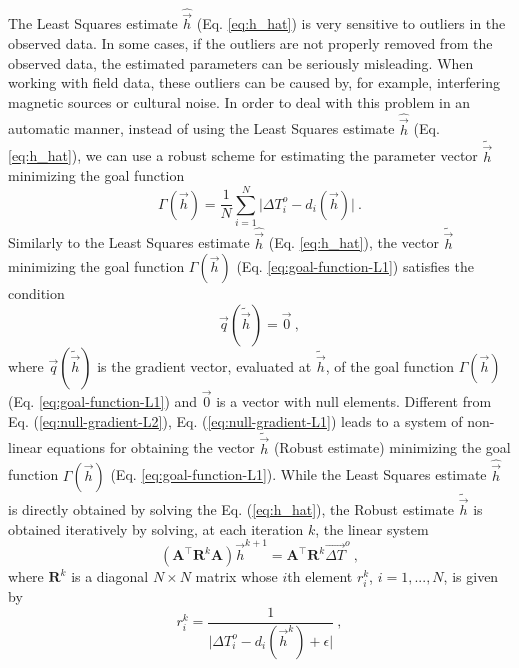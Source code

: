 \documentclass[journal abbreviation, npg]{copernicus}
\begin{document}
The Least Squares estimate $\hat{\vec{h}}$ (Eq. \ref{eq:h_hat}) is very sensitive to outliers in the observed data. In some cases, if the outliers are not properly removed from the observed data, the estimated parameters can be seriously misleading. When working with field data, these outliers can be caused by, for example, interfering magnetic sources or cultural noise. In order to deal with this problem in an automatic manner, instead of using the Least Squares estimate $\hat{\vec{h}}$ (Eq. \ref{eq:h_hat}), we can use a robust scheme for estimating the parameter vector $\tilde{\vec{h}}$ minimizing the goal function
\begin{equation}
\Gamma(\vec{h}) = \frac{1}{N} \sum_{i = 1}^{N} 
\vert \Delta T^{o}_{i} - d_{i}(\vec{h}) \vert \: .
\label{eq:goal-function-L1}
\end{equation}
Similarly to the Least Squares estimate $\hat{\vec{h}}$ (Eq. \ref{eq:h_hat}), the vector $\tilde{\vec{h}}$ minimizing the goal function $\Gamma(\vec{h})$ (Eq. \ref{eq:goal-function-L1}) satisfies the condition
\begin{equation}
\vec{q}(\tilde{\vec{h}}) = \vec{0} \: ,
\label{eq:null-gradient-L1}
\end{equation}
where $\vec{q}(\tilde{\vec{h}})$ is the gradient vector, evaluated at $\tilde{\vec{h}}$, of the goal function $\Gamma(\vec{h})$ (Eq. \ref{eq:goal-function-L1}) and $\vec{0}$ is a vector with null elements. Different from Eq. (\ref{eq:null-gradient-L2}), Eq. (\ref{eq:null-gradient-L1}) leads to a system of non-linear equations for obtaining the vector $\tilde{\vec{h}}$ (Robust estimate) minimizing the goal function $\Gamma(\vec{h})$ (Eq. \ref{eq:goal-function-L1}). While the Least Squares estimate $\hat{\vec{h}}$ is directly obtained by solving the Eq. (\ref{eq:h_hat}), the Robust estimate $\tilde{\vec{h}}$ is obtained iteratively by solving, at each iteration $k$, the linear system
\begin{equation}
\left( \mathbf{A}^{\intercal} \mathbf{R}^{k} \mathbf{A} \right) \vec{h}^{k+1} =
\mathbf{A}^{\intercal} \mathbf{R}^{k} \vec{\Delta T}^{o} \: ,
\label{eq:iteration-L1}
\end{equation}
where $\mathbf{R}^{k}$ is a diagonal $N \times N$ matrix whose $i$th element $r_{i}^{k}$, $i = 1, ..., N$, is given by
\begin{equation}
r_{i}^{k} = \dfrac{1}{\vert \Delta T^{o}_{i} - d_{i}(\vec{h}^{k}) + \epsilon \vert} \: ,
\label{eq:ri}
\end{equation}
\end{document}
